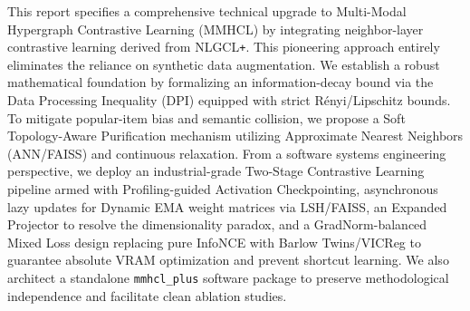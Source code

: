     \begin{tcolorbox}[abstractstyle, title={Abstract}]
    This report specifies a comprehensive technical upgrade to Multi-Modal Hypergraph Contrastive Learning (MMHCL) by integrating neighbor-layer contrastive learning derived from NLGCL\texttt{+}. This pioneering approach entirely eliminates the reliance on synthetic data augmentation. We establish a robust mathematical foundation by formalizing an information-decay bound via the Data Processing Inequality (DPI) equipped with strict R\'enyi/Lipschitz bounds. To mitigate popular-item bias and semantic collision, we propose a Soft Topology-Aware Purification mechanism utilizing Approximate Nearest Neighbors (ANN/FAISS) and continuous relaxation. From a software systems engineering perspective, we deploy an industrial-grade Two-Stage Contrastive Learning pipeline armed with Profiling-guided Activation Checkpointing, asynchronous lazy updates for Dynamic EMA weight matrices via LSH/FAISS, an Expanded Projector to resolve the dimensionality paradox, and a GradNorm-balanced Mixed Loss design replacing pure InfoNCE with Barlow Twins/VICReg to guarantee absolute VRAM optimization and prevent shortcut learning. We also architect a standalone \texttt{mmhcl\_plus} software package to preserve methodological independence and facilitate clean ablation studies.
    \end{tcolorbox}
    
